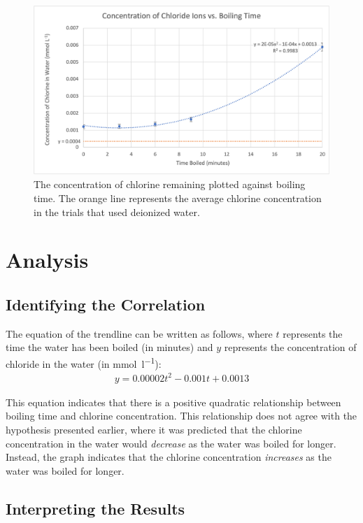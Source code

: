 \documentclass[11pt]{article}
\begin{document}
\begin{figure}[H]
	\centering
	\caption{The concentration of chlorine remaining plotted against boiling time. The orange line represents the average chlorine concentration in the trials that used deionized water.}
	\includegraphics[width=1\linewidth]{assets/concentration-vs-boiling-time.png}
\end{figure}

\section{Analysis}

\subsection{Identifying the Correlation}

The equation of the trendline can be written as follows, where $t$ represents the time the water has been boiled (in minutes) and $y$ represents the concentration of chloride in the water (in \si{\mmol\per\litre}):
%
\begin{align*}
	y = 0.00002t^2 - 0.001t + 0.0013
\end{align*}

This equation indicates that there is a positive quadratic relationship between boiling time and chlorine concentration. This relationship does not agree with the hypothesis presented earlier, where it was predicted that the chlorine concentration in the water would \textit{decrease} as the water was boiled for longer. Instead, the graph indicates that the chlorine concentration \textit{increases} as the water was boiled for longer.

\subsection{Interpreting the Results}
\end{document}
